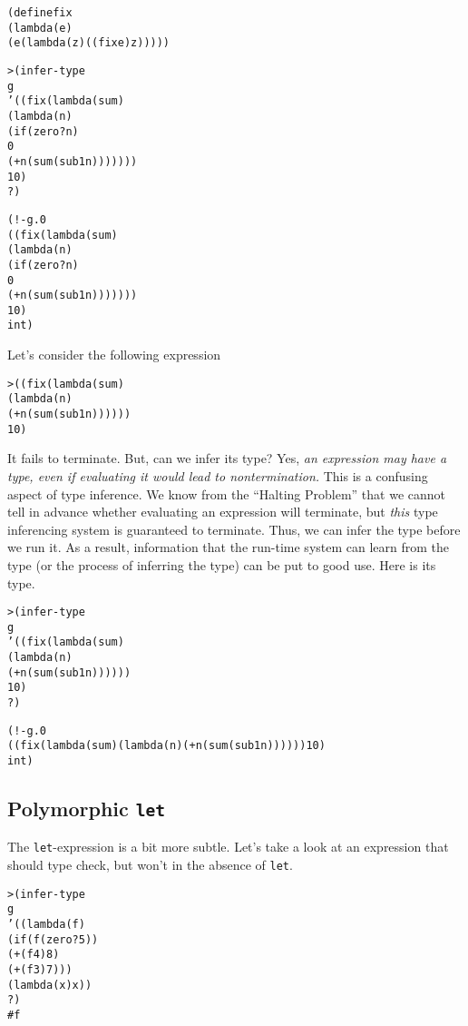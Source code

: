 \begin{alltt}
(define fix
  (lambda (e)
    (e (lambda (z) ((fix e) z)))))
\end{alltt}

\begin{alltt}
> (infer-type
    g
    '((fix (lambda (sum)
             (lambda (n)
               (if (zero? n)
                 0
                 (+ n (sum (sub1 n)))))))
      10)
    ?)

(!- g.0
    ((fix (lambda (sum)
            (lambda (n)
              (if (zero? n)
                0 
                (+ n (sum (sub1 n)))))))
     10)
    int)
\end{alltt}

Let's consider the following expression
\begin{alltt}
> ((fix (lambda (sum)
          (lambda (n)
            (+ n (sum (sub1 n))))))
   10)
\end{alltt}

It fails to terminate.  But, can we infer its type?  Yes, \emph{an
expression may have a type, even if evaluating it would lead to
nontermination.}  This is a confusing aspect of type inference.  We
know from the ``Halting Problem'' that we cannot tell in advance
whether evaluating an expression will terminate, but \emph{this}
type inferencing system is guaranteed to terminate.  Thus, we
can infer the type before we run it.  As a result, information that
the run-time system can learn from the type (or the process of
inferring the type) can be put to good use.  Here is its type.
\newpage
\begin{alltt}
> (infer-type
    g
    '((fix (lambda (sum)
             (lambda (n)
               (+ n (sum (sub1 n))))))
      10)
    ?)

(!- g.0
    ((fix (lambda (sum) (lambda (n) (+ n (sum (sub1 n)))))) 10)
    int)
\end{alltt}

\subsection{Polymorphic \texttt{let}}

The \texttt{let}-expression is a bit more subtle.  Let's take a look at
an expression that should type check, but won't in the absence of
\texttt{let}.

\begin{alltt}
> (infer-type
    g
    '((lambda (f)
        (if (f (zero? 5))
          (+ (f 4) 8)
          (+ (f 3) 7)))
      (lambda (x) x))
    ?)
#f
\end{alltt}

